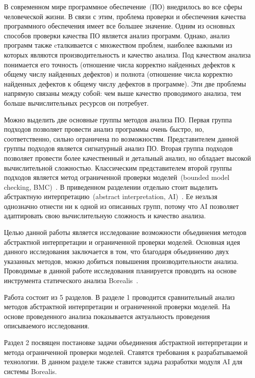 \intro
В современном мире программное обеспечение~(ПО) внедрилось во все сферы 
человеческой жизни. В связи с этим, проблема проверки и обеспечения качества 
программного обеспечения имеет все большее значение. Одним из основных способов 
проверки качества ПО является анализ программ. Однако, анализ программ также 
cталкивается с множеством проблем, наиболее важными из которых являются 
производительность и качество анализа. Под качеством анализа понимается его 
точность (отношение числа корректно найденных дефектов к общему числу найденных 
де­фектов) и полнота (отношение числа корректно найденных дефектов к общему 
числу дефектов в программе). Эти две проблемы напрямую связаны между собой:
чем выше качество проводимого анализа, тем больше вычислительных ресурсов он 
потребует.

Можно выделить две основные группы методов анализа ПО. Первая группа подходов 
позволяет провести анализ программы очень быстро, но, соответственно, сильно
ограничена по возможностям. Представителем данной группы подходов является 
сигнатурный анализ ПО. Вторая группа подходов позволяет провести более 
качественный и детальный анализ, но обладает высокой вычислительной сложностью.
Классическим представителем второй группы подходов является метод ограниченной 
проверки моделей~(bounded model checking, BMC)~\cite{bmc}. В приведенном 
разделении отдельно стоит выделить абстрактную интерпретацию~(abstract 
interpretation, AI)~\cite{ai}. Ее незльзя однозначно отнести ни к одной 
из описанных групп, потому что AI позволяет адаптировать свою вычислительную 
сложность и качество анализа.

Целью данной работы является исследование возможности объединения методов 
абстрактной интерпретации и ограниченной проверки моделей. Основная идея 
данного исследования заключается в том, что благодаря объединению двух 
указанных методов, можно добиться повышения производительности анализа. 
Проводимые в данной работе исследования планируется проводить на основе 
инструмента статического анализа Borealis~\cite{borealis}.

Работа состоит из 5 разделов. В разделе 1 проводится сравнительный анализ 
методов абстрактной интерпретации и ограниченной проверки моделей. На основе 
проведенного анализа показывается актуальность проведения описываемого 
исследования.

Раздел 2 посвящен постановке задачи объединения абстрактной интерпретации и
метода ограниченной проверки моделей. Ставятся требования к разрабатываемой 
технологии. В данном разделе также ставится задача разработки модуля AI для
системы Borealis.

